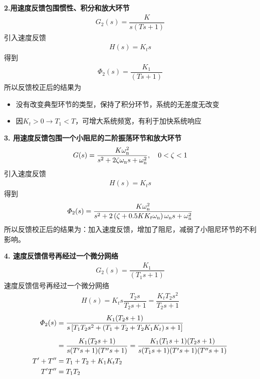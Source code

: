 \noindent \textbf{2.用速度反馈包围惯性、积分和放大环节}
\begin{align}
	G_2(s) = \dfrac{K}{s(Ts + 1)}
\end{align}
引入速度反馈
\begin{align}
	H(s) = K_t s
\end{align}
得到
\begin{align}
	\varPhi_2(s) = \dfrac{K_1}{(Ts + 1)}
\end{align}
所以反馈校正后的结果为
\begin{itemize}
	\item 没有改变典型环节的类型，保持了积分环节，系统的无差度无改变
	\item 因$K_t>0 \rightarrow T_1<T$，可增大系统频宽，有利于加快系统响应
\end{itemize}
\vspace*{1.5em}

\noindent \textbf{3. 用速度反馈包围一个小阻尼的二阶振荡环节和放大环节}
\begin{align}
	G(s) = \dfrac{K \omega_{\rm{n}}^2}{s^2 + 2\zeta \omega_{\rm{n}} s + \omega_{{\rm{n}}}^2 }, \quad 0< \zeta < 1
\end{align}
引入速度反馈
\begin{align}
	H(s) = K_t s
\end{align}
得到
\begin{align}
	\varPhi_2(s) = \dfrac{K\omega_{\rm{n}}^2}{s^2 + 2 \left(\zeta + 0.5 KK_t \omega_{\rm{n}} \right) \omega_{\rm{n}} s+ \omega_{\rm{n}}^2}
\end{align}
所以反馈校正后的结果为：加入速度反馈，增加了阻尼，减弱了小阻尼环节的不利影响。

\noindent \textbf{4. 速度反馈信号再经过一个微分网络}
\begin{align}
	G_2(s) = \dfrac{K_1}{(T_1 s + 1)}
\end{align}
速度反馈信号再经过一个微分网络
\begin{align}
	H(s) = K_t s \dfrac{T_2 s}{T_2 s + 1} = \dfrac{K_t T_2 s^2}{T_2s + 1}
\end{align}
\begin{align}
	\varPhi_2(s) &= \dfrac{K_1(T_2 s + 1)}{s \left[T_1T_2s^2 + \left(T_1 + T_2 + T_2K_1K_t\right)s + 1 \right]}\notag \\[0.5em]
	& =\dfrac{K_1(T_2s + 1)}{s(T's + 1)(T''s + 1)} =\dfrac{K_1(T_1s + 1)(T_2s + 1)}{s(T_1s + 1)(T's + 1)(T''s + 1)}\\
	T' + T'' &= T_1 + T_2 + K_1K_tT_2\notag \\
	T'T'' &= T_1 T_2\notag
\end{align}


